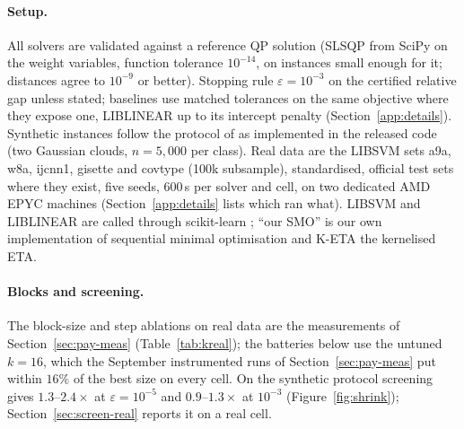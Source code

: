 \documentclass[pdflatex,sn-apa]{sn-jnl}%
\theoremstyle{thmstyleone}
\theoremstyle{thmstyletwo}
\begin{document}
\paragraph{Setup.} All solvers are validated against a reference QP
solution (SLSQP from SciPy on the weight variables, function tolerance
$10^{-14}$, on instances small enough for it; distances agree to
$10^{-9}$ or better). Stopping rule
$\varepsilon=10^{-3}$ on the certified relative gap unless stated;
baselines use matched tolerances on the same objective where they
expose one, LIBLINEAR up to its intercept penalty
(Section~\ref{app:details}). Synthetic instances follow the protocol
of \citet{gupta2026} as implemented in the released code (two Gaussian
clouds, $n=5{,}000$ per class). Real data
are the LIBSVM sets a9a, w8a, ijcnn1, gisette and covtype (100k
subsample), standardised, official test sets where they exist, five
seeds, 600\,s per solver and cell, on two dedicated AMD EPYC machines
(Section~\ref{app:details} lists which ran what).
LIBSVM \citep{chang2011} and LIBLINEAR \citep{fan2008} are called
through scikit-learn \citep{pedregosa2011}; ``our SMO'' is our own
implementation of sequential minimal optimisation \citep{platt1998} and
K-ETA the kernelised ETA.

\paragraph{Blocks and screening.} The block-size and step ablations
on real data are the measurements of Section~\ref{sec:pay-meas}
(Table~\ref{tab:kreal}); the batteries below use the untuned $k{=}16$,
which the September instrumented runs of Section~\ref{sec:pay-meas} put
within $16\%$ of the best size on every cell. On the synthetic protocol screening gives
$1.3$--$2.4\times$ at $\varepsilon=10^{-5}$ and $0.9$--$1.3\times$ at $10^{-3}$
(Figure~\ref{fig:shrink}); Section~\ref{sec:screen-real} reports it on
a real cell.
\end{document}
